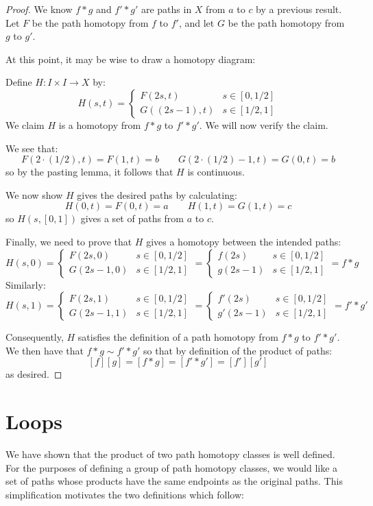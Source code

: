 \begin{proof}
We know $f*g$ and $f'*g'$ are paths in $X$ from $a$ to $c$ by a previous result. 
Let $F$ be the path homotopy from $f$ to $f'$, and let $G$ be the path homotopy from $g$ to $g'$.

At this point, it may be wise to draw a homotopy diagram:
\placeholder

Define $H:I\times I\to X$ by:
\[H(s,t) = \begin{cases} F(2s,t) & s\in [0,1/2] \\ G((2s-1),t) & s\in [1/2,1] \end{cases}\]
We claim $H$ is a homotopy from $f*g$ to $f'*g'$. We will now verify the claim. 

We see that:
\[F(2\cdot(1/2),t) = F(1,t) = b \qquad G(2\cdot(1/2) -1,t) = G(0,t) = b\]
so by the pasting lemma, it follows that $H$ is continuous.

We now show $H$ gives the desired paths by calculating:
\[H(0,t) = F(0,t) = a \qquad H(1,t) = G(1,t) = c\]
so $H(s,[0,1])$ gives a set of paths from $a$ to $c$. 

Finally, we need to prove that $H$ gives a homotopy between the intended paths:
\[H(s,0) = \begin{cases}F(2s,0) & s\in [0,1/2] \\ G(2s-1,0) & s\in [1/2,1]  \end{cases} = \begin{cases} f(2s) & s\in [0,1/2] \\ g(2s-1) & s\in [1/2,1] \end{cases}= f*g \]
Similarly:
\[H(s,1) = \begin{cases}F(2s,1) & s\in [0,1/2] \\ G(2s-1,1) & s\in [1/2,1]  \end{cases} = \begin{cases} f'(2s) & s\in [0,1/2] \\ g'(2s-1) & s\in [1/2,1] \end{cases}= f'*g'  \]

Consequently, $H$ satisfies the definition of a path homotopy from $f*g$ to $f'*g'$. We then have that $f*g\sim f'*g'$ so that by definition of the product of paths:
\[[f][g] = [f*g] = [f'*g'] = [f'][g']\]
as desired.
\end{proof}




\section{Loops}
We have shown that the product of two path homotopy classes is well defined.
For the purposes of defining a group of path homotopy classes, we would like a set of paths whose products have the same endpoints as the original paths. This simplification motivates the two definitions which follow:

